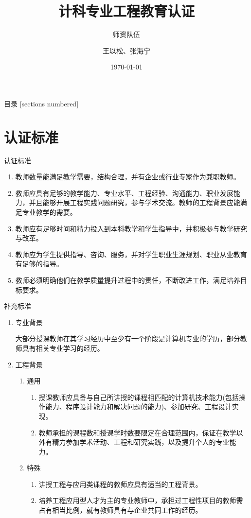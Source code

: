 \documentclass{beamer}
\title{计科专业工程教育认证}
\subtitle{师资队伍}
\date{\today}
\author{王以松、张海宁}
\institute{计科}
\begin{document}
\maketitle
\begin{frame}{目录}
[sections numbered]
\tableofcontents[hideallsubsections]

\end{frame}
\section{认证标准}
\begin{frame}{认证标准}

\begin{enumerate}
\item
教师数量能满足教学需要，结构合理，并有企业或行业专家作为兼职教师。
\item
教师应具有足够的教学能力、专业水平、工程经验、沟通能力、职业发展能力，并且能够开展工程实践问题研究，参与学术交流。教师的工程背景应能满足专业教学的需要。
\item
教师应有足够时间和精力投入到本科教学和学生指导中，并积极参与教学研究与改革。
\item
教师应为学生提供指导、咨询、服务，并对学生职业生涯规划、职业从业教育有足够的指导。
\item
教师必须明确他们在教学质量提升过程中的责任，不断改进工作，满足培养目标要求。

\end{enumerate}
\end{frame}
\begin{frame}{补充标准}
\begin{enumerate}
\item
专业背景

大部分授课教师在其学习经历中至少有一个阶段是计算机专业的学历，部分教师具有相关专业学习的经历。
\item
工程背景
\begin{enumerate}
\item
通用
\begin{enumerate}
\item
授课教师应具备与自己所讲授的课程相匹配的计算机技术能力(包括操作能力、程序设计能力和解决问题的能力)、参加研究、工程设计实现。
\item
教师承担的课程数和授课学时数要限定在合理范围内，保证在教学以外有精力参加学术活动、工程和研究实践，以及提升个人的专业能力。
\end{enumerate}
\item
特殊
\begin{enumerate}
\item
讲授工程与应用类课程的教师应具有适当的工程背景。
\item
培养工程应用型人才为主的专业教师中，承担过工程性项目的教师需占有相当比例，就有教师具有与企业共同工作的经历。
\end{enumerate}
\end{enumerate}
\end{enumerate}
\end{frame}
\end{document}
